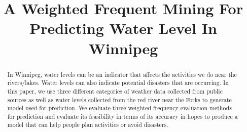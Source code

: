 \documentclass[10pt, conference, compsocconf]{IEEEtran}
\begin{document}
\onecolumn
%
\title{A Weighted Frequent Mining For Predicting Water Level In Winnipeg}



\author{
}


\maketitle


\begin{abstract}
In Winnipeg, water levels can be an indicator that affects the activities we do near the rivers/lakes. Water levels can also indicate potential disasters that are occurring. In this paper, we use three different categories of weather data collected from public sources as well as water levels collected from the red river near the Forks to generate model used for prediction. We evaluate three weighted frequency evaluation methods for prediction and evaluate its feasibility in terms of its accuracy in hopes to produce a model that can help people plan activities or avoid disasters. 

\end{abstract}

%
\IEEEpeerreviewmaketitle
\end{document}
